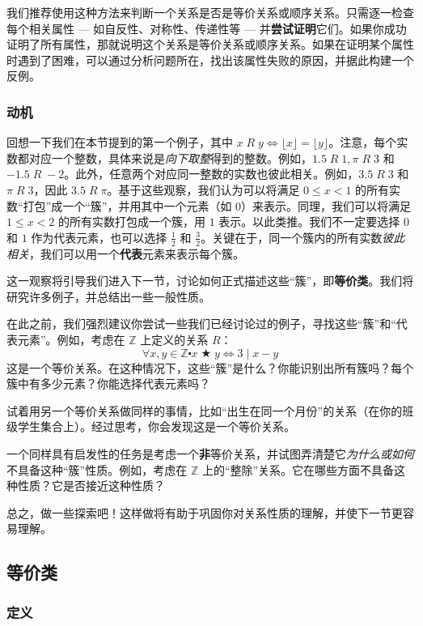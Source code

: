 我们推荐使用这种方法来判断一个关系是否是等价关系或顺序关系。只需逐一检查每个相关属性 --- 如自反性、对称性、传递性等 --- 并\textbf{尝试证明}它们。如果你成功证明了所有属性，那就说明这个关系是等价关系或顺序关系。如果在证明某个属性时遇到了困难，可以通过分析问题所在，找出该属性失败的原因，并据此构建一个反例。

\subsubsection*{动机}

回想一下我们在本节提到的第一个例子，其中 $x \;R\; y \iff \lfloor x \rfloor = \lfloor y \rfloor$。注意，每个实数都对应一个整数，具体来说是\emph{向下取整}得到的整数。例如，$1.5 \;R\; 1, \pi \;R\; 3$ 和 $-1.5 \;R\; -2$。此外，任意两个对应同一整数的实数也彼此相关。例如，$3.5 \;R\; 3$ 和 $\pi \;R\; 3$，因此 $3.5 \;R\; \pi$。基于这些观察，我们认为可以将满足 $0 \le x < 1$ 的所有实数``打包''成一个``簇''，并用其中一个元素（如 $0$）来表示。同理，我们可以将满足 $1 \le x < 2$ 的所有实数打包成一个簇，用 $1$ 表示。以此类推。我们不一定要选择 $0$ 和 $1$ 作为代表元素，也可以选择 $\frac{1}{2}$ 和 $\frac{3}{2}$。关键在于，同一个簇内的所有实数\emph{彼此相关}，我们可以用一个\textbf{代表}元素来表示每个簇。

这一观察将引导我们进入下一节，讨论如何正式描述这些``簇''，即\textbf{等价类}。我们将研究许多例子，并总结出一些一般性质。

在此之前，我们强烈建议你尝试一些我们已经讨论过的例子，寻找这些``簇''和``代表元素''。例如，考虑在 $\mathbb{Z}$ 上定义的关系 $R$：
\[\forall x, y \in \mathbb{Z} \centerdot x \;\bigstar\; y \iff 3 \mid x - y\]
这是一个等价关系。在这种情况下，这些``簇''是什么？你能识别出所有簇吗？每个簇中有多少元素？你能选择代表元素吗？

试着用另一个等价关系做同样的事情，比如``出生在同一个月份''的关系（在你的班级学生集合上）。经过思考，你会发现这是一个等价关系。

一个同样具有启发性的任务是考虑一个\textbf{非}等价关系，并试图弄清楚它\emph{为什么或如何}不具备这种``簇''性质。例如，考虑在 $\mathbb{Z}$ 上的``整除''关系。它在哪些方面不具备这种性质？它是否接近这种性质？

总之，做一些探索吧！这样做将有助于巩固你对关系性质的理解，并使下一节更容易理解。

\subsection{等价类}

\subsubsection*{定义}

